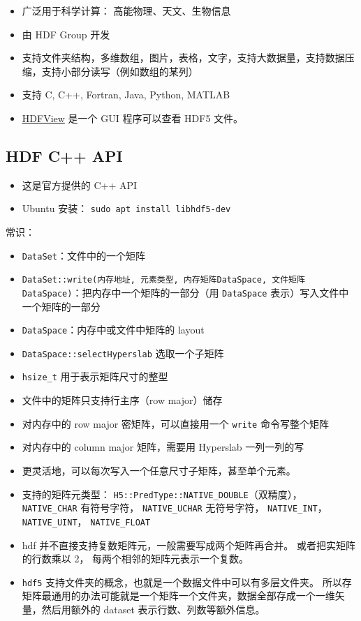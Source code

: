 

\begin{issues}
\issueDraft
\end{issues}

\begin{itemize}
\item 广泛用于科学计算： 高能物理、天文、生物信息
\item 由 HDF Group 开发
\item 支持文件夹结构，多维数组，图片，表格，文字，支持大数据量，支持数据压缩，支持小部分读写（例如数组的某列）
\item 支持 C, C++, Fortran, Java, Python, MATLAB
\item \href{https://www.hdfgroup.org/downloads/hdfview/}{HDFView} 是一个 GUI 程序可以查看 HDF5 文件。
\end{itemize}

\subsection{HDF C++ API}
\begin{itemize}
\item 这是官方提供的 C++ API
\item Ubuntu 安装： \verb|sudo apt install libhdf5-dev|
\end{itemize}

常识：
\begin{itemize}
\item \verb|DataSet|：文件中的一个矩阵
\item \verb|DataSet::write(内存地址, 元素类型, 内存矩阵DataSpace, 文件矩阵DataSpace)|：把内存中一个矩阵的一部分（用 \verb`DataSpace` 表示）写入文件中一个矩阵的一部分
\item \verb|DataSpace|：内存中或文件中矩阵的 layout
\item \verb|DataSpace::selectHyperslab| 选取一个子矩阵
\item \verb`hsize_t` 用于表示矩阵尺寸的整型
\item 文件中的矩阵只支持行主序（row major）储存
\item 对内存中的 row major 密矩阵，可以直接用一个 \verb`write` 命令写整个矩阵
\item 对内存中的 column major 矩阵，需要用 Hyperslab 一列一列的写
\item 更灵活地，可以每次写入一个任意尺寸子矩阵，甚至单个元素。
\item 支持的矩阵元类型： \verb`H5::PredType::NATIVE_DOUBLE`（双精度）， \verb`NATIVE_CHAR` 有符号字符， \verb`NATIVE_UCHAR` 无符号字符， \verb`NATIVE_INT`， \verb`NATIVE_UINT`， \verb`NATIVE_FLOAT`
\item hdf 并不直接支持复数矩阵元，一般需要写成两个矩阵再合并。 或者把实矩阵的行数乘以 2， 每两个相邻的矩阵元表示一个复数。
\item \verb`hdf5` 支持文件夹的概念，也就是一个数据文件中可以有多层文件夹。 所以存矩阵最通用的办法可能就是一个矩阵一个文件夹，数据全部存成一个一维矢量，然后用额外的 dataset 表示行数、列数等额外信息。
\end{itemize}



